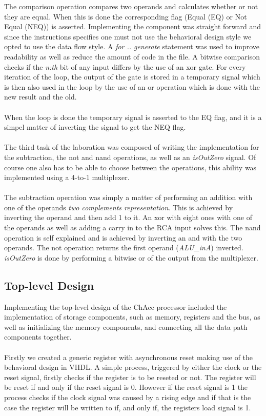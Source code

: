 \documentclass[a4paper,11pt]{article}
\begin{document}
\noindent
The comparison operation compares two operands and calculates whether or not 
they are equal. When this is done the corresponding flag (Equal (EQ) or Not 
Equal (NEQ)) is asserted. Implementing the component was straight forward and 
since the instructions specifies one must not use the behavioral design style 
we opted to use the data flow style. A {\it for .. generate} statement was used 
to improve readability as well as reduce the amount of code in the file. A 
bitwise comparison checks if the {\it n:th} bit of any input differs by the 
use of an xor gate. For every iteration of the loop, the output of the gate is 
stored in a temporary signal which is then also used in the loop by the use 
of an or operation which is done with the new result and the old.\\\\
\noindent
When the loop is done the temporary signal is asserted to the EQ flag, and it 
is a simpel matter of inverting the signal to get the NEQ flag.\\\\
\noindent
The third task of the laboration was composed of writing the implementation 
for the subtraction, the not and nand operations, as well as an {\it isOutZero} 
signal. Of course one also has to be able to choose between the 
operations, this ability  was implemented using a 4-to-1 multiplexer.\\\\
\noindent
The subtraction operation was simply a matter of performing an addition with 
one of the operands {\it two complements representation}. This is achieved by 
inverting the operand and then add 1 to it. An xor with eight ones with one of 
the operands as well as adding a carry in to the RCA input solves this. The 
nand operation is self explained and is achieved by inverting an and with the 
two operands. The not operation returns the first operand ({\it ALU\_inA}) 
inverted. {\it isOutZero} is done by performing a bitwise or of the output 
from the multiplexer.

\subsection{Top-level Design}
Implementing the top-level design of the ChAcc processor included the 
implementation of storage components, such as memory, registers and the 
bus, as well as initializing the memory components, and connecting all the 
data path components together.\\\\
\noindent
Firstly we created a generic register with asynchronous reset making use 
of the behavioral design in VHDL. A simple process, triggered by either 
the clock or the reset signal, firstly checks if the register is to be reseted 
or not. The register will be reset if and only if the reset signal is 0. 
However if the reset signal is 1 the process checks if the clock signal was 
caused by a rising edge and if that is the case the register will be written 
to if, and only if, the registers load signal is 1.\\
\end{document}
